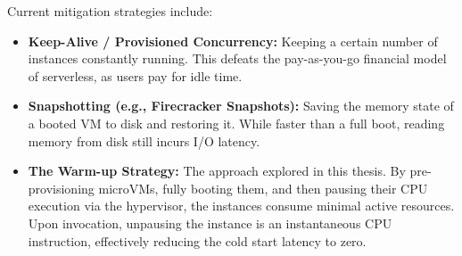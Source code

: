 Current mitigation strategies include:
\begin{itemize}
    \item \textbf{Keep-Alive / Provisioned Concurrency:} Keeping a certain number of instances constantly running. This defeats the pay-as-you-go financial model of serverless, as users pay for idle time.
    \item \textbf{Snapshotting (e.g., Firecracker Snapshots):} Saving the memory state of a booted VM to disk and restoring it. While faster than a full boot, reading memory from disk still incurs I/O latency.
    \item \textbf{The Warm-up Strategy:} The approach explored in this thesis. By pre-provisioning microVMs, fully booting them, and then pausing their CPU execution via the hypervisor, the instances consume minimal active resources. Upon invocation, unpausing the instance is an instantaneous CPU instruction, effectively reducing the cold start latency to zero.
\end{itemize}

\vspace{2cm}
\lipsum[21-40] %
